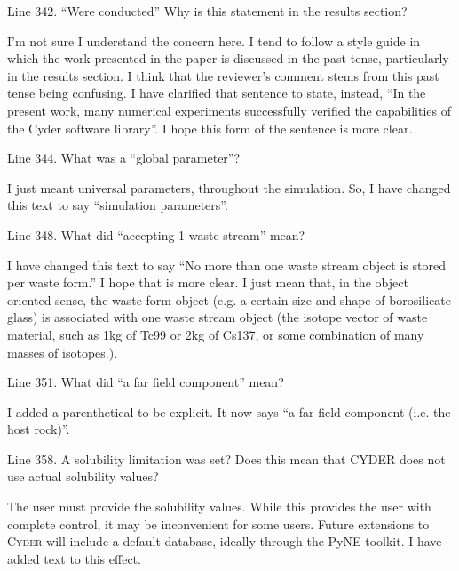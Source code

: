 \documentclass[answers,12pt]{exam}
\newcommand{\Cyder}{\textsc{Cyder}\xspace}%
\begin{document}
\begin{questions}
 

\question Line 342. ``Were conducted'' Why is this statement in the results 
section?
\begin{solution}
I'm not sure I understand the concern here. I tend to follow a style guide in 
        which the work presented in the paper is discussed in the past tense, 
        particularly in the results section. I think that the reviewer's 
        comment stems from this past tense being confusing. I have clarified 
        that sentence to state, instead, ``In the present work, many numerical 
        experiments successfully verified the capabilities of the Cyder 
        software library''. I hope this form of the sentence is more clear.
\end{solution}

 

\question Line 344. What was a ``global parameter''?
\begin{solution}
I just meant universal parameters, throughout the simulation. So, I have 
        changed this text to say ``simulation parameters''.
\end{solution}

 

\question Line 348. What did ``accepting 1 waste stream'' mean?
\begin{solution}
        I have changed this text to say ``No more than one waste stream object 
        is stored per waste form.'' I hope that is more clear. I just mean 
        that, in the object oriented sense, the waste form object (e.g. a 
        certain size and shape of borosilicate glass) is associated with one 
        waste stream object (the isotope vector of waste material, such as 1kg 
        of Tc99 or 2kg of Cs137, or some combination of many masses of 
        isotopes.).
\end{solution}

 

\question Line 351. What did ``a far field component'' mean?
\begin{solution}
I added a parenthetical to be explicit. It now says ``a far field component 
        (i.e. the host rock)''.
\end{solution}

 

\question Line 358. A solubility limitation was set? Does this mean that CYDER 
does not use actual solubility values?
\begin{solution}
The user must provide the solubility values. While this provides the user with 
        complete control, it may be inconvenient for some users. Future 
        extensions to \Cyder will include a default database, ideally through 
        the PyNE toolkit. I have added text to this effect.
\end{solution}


\end{questions}
\end{document}
